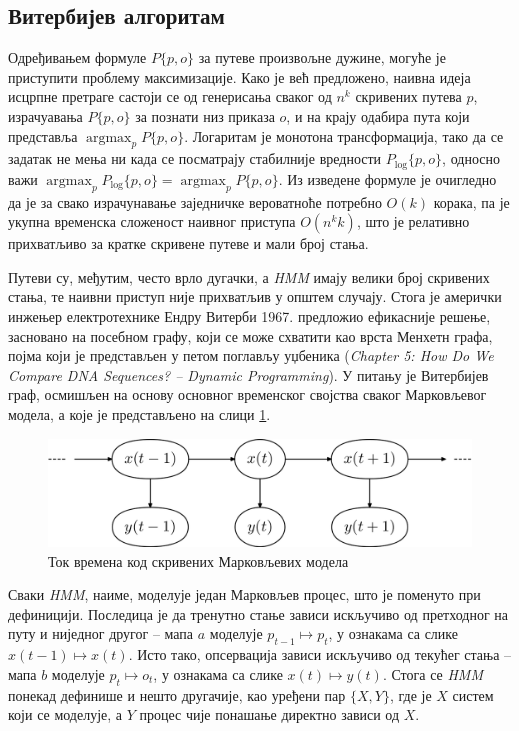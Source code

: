 \documentclass[12pt,oneside]{memoir}
\begin{document}
\begin{CJK}{UTF8}{ipxm}
\section{Витербијев алгоритам}
Одређивањем формуле $P\{p, o\}$ за путеве произвољне дужине, могуће је приступити проблему максимизације. Како је већ предложено, наивна идеја исцрпне претраге састоји се од генерисања сваког од $n^k$ скривених путева $p$, израчуавања $P\{p, o\}$ за познати низ приказа $o$, и на крају одабира пута који представља $\operatorname*{argmax}_p P\{p, o\}$. Логаритам је монотона трансформација, тако да се задатак не мења ни када се посматрају стабилније вредности $P_{\log}\{p, o\}$, односно важи $\operatorname*{argmax}_p P_{\log}\{p, o\} = \operatorname*{argmax}_p P\{p, o\}$. Из изведене формуле је очигледно да је за свако израчунавање заједничке вероватноће потребно $O(k)$ корака, па је укупна временска сложеност наивног приступа $O(n^k k)$, што је релативно прихватљиво за кратке скривене путеве и мали број стања.

Путеви су, међутим, често врло дугачки, а \textit{HMM} имају велики број скривених стања, те наивни приступ није прихватљив у општем случају. Стога је амерички инжењер електротехнике Ендру Витерби 1967. предложио ефикасније решење\cite{viterbi1967}, засновано на посебном графу, који се може схватити као врста Менхетн графа, појма који је представљен у петом поглављу уџбеника (\textit{Chapter 5: How Do We Compare DNA Sequences? -- Dynamic Programming}). У питању је Витербијев граф, осмишљен на основу основног временског својства сваког Марковљевог модела, а које је представљено на слици \ref{fig:vreme}.

\begin{figure}[!ht]
  \centering
  \includegraphics[width=.85\textwidth]{vreme.png}
  \caption{Ток времена код скривених Марковљевих модела\cite{vreme}}
  \label{fig:vreme}
\end{figure}

Сваки \textit{HMM}, наиме, моделује један Марковљев процес, што је поменуто при дефиницији. Последица је да тренутно стање зависи искључиво од претходног на путу и ниједног другог -- мапа $a$ моделује $p_{t-1} \mapsto p_t$, у ознакама са слике $x(t-1) \mapsto x(t)$. Исто тако, опсервација зависи искључиво од текућег стања -- мапа  $b$ моделује $p_t \mapsto o_t$, у ознакама са слике $x(t) \mapsto y(t)$. Стога се \textit{HMM} понекад дефинише и нешто другачије, као уређени пар $\{X, Y\}$, где је $X$ систем који се моделује, а $Y$ процес чије понашање директно зависи од $X$.


\end{CJK}
\end{document}
